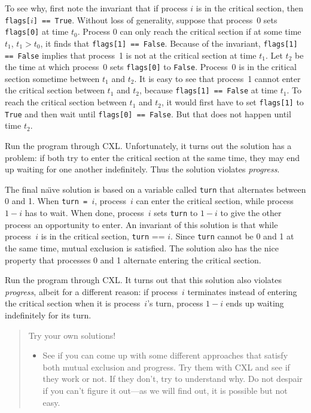 \documentclass{report}
\begin{document}
To see why, first note the invariant that if process $i$ is in the
critical section, then \texttt{flags[$i$] == True}.
Without loss of generality,
suppose that process~0 sets \texttt{flags[0]} at time $t_0$.
Process 0 can only reach the critical section if at some time $t_1$,
$t_1 > t_0$, it finds that \texttt{flags[1] == False}.
Because of the invariant, \texttt{flags[1] == False} implies that
process~1 is not at the critical section at time $t_1$.
Let $t_2$ be the time at which process~0 sets \texttt{flags[0]}
to \texttt{False}.  Process~0 is in the critical section sometime
between $t_1$ and $t_2$.
It is easy to see that process~1 cannot enter the critical section
between $t_1$ and $t_2$, because \texttt{flags[1] == False} at
time $t_1$.  To reach the critical section between $t_1$ and $t_2$,
it would first have to set \texttt{flags[1]} to \texttt{True} and
then wait until \texttt{flags[0] == False}.  But that does not happen
until time $t_2$.

Run the program through CXL.  Unfortunately, it turns out the solution has a
problem: if both try to enter the critical section at the same time, they may
end up waiting for one another indefinitely.  Thus the solution
violates \emph{progress}.

The final na\"{\i}ve solution is based on a variable called \texttt{turn}
that alternates between 0 and 1.  When \texttt{turn = $i$}, process~$i$ can
enter the critical section, while process $1-i$ has to wait.  When done,
process~$i$ sets \texttt{turn} to $1-i$ to give the other process an
opportunity to enter.
An invariant of this solution is that while process~$i$ is in the critical
section, \texttt{turn} == $i$.
Since \texttt{turn} cannot be 0 and 1 at
the same time, mutual exclusion is satisfied.
The solution also has the nice property that
processes 0 and 1 alternate entering the critical section.

Run the program through CXL.  It turns out that this solution also violates
\emph{progress}, albeit for a different reason:
if process~$i$ terminates instead of entering the critical section when it
is process~$i$'s turn, process $1-i$ ends up waiting indefinitely for its
turn.

\begin{quote}
Try your own solutions!
\begin{itemize}
\item See if you can come up with some different approaches that satisfy both
mutual exclusion and progress.  Try them with CXL and see if they work or not.
If they don't, try to understand why.
Do not despair if you can't figure it out---as
we will find out, it is possible but not easy.
\end{itemize}
\end{quote}
\end{document}

